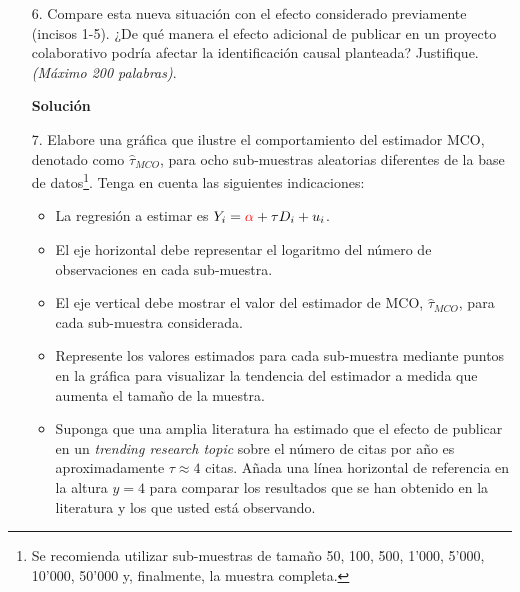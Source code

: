 \documentclass[a4paper, answers, addpoints, 11pt]{exam}
\begin{document}
\bigskip
\begin{itemize}
    \item[6.] Compare esta nueva situación con el efecto considerado previamente (incisos 1-5). ¿De qué manera el efecto adicional de publicar en un proyecto colaborativo podría afectar la identificación causal planteada? Justifique. \textit{(Máximo 200 palabras)}.
     \begin{mdframed}
        \textbf{Solución}
        \end{mdframed}

    \item[7.] Elabore una gráfica que ilustre el comportamiento del estimador MCO, denotado como $\hat{\tau}_{MCO}$, para ocho sub-muestras aleatorias diferentes de la base de datos\footnote{Se recomienda utilizar sub-muestras de tamaño 50, 100, 500, 1'000, 5'000, 10'000, 50'000 y, finalmente, la muestra completa.}. Tenga en cuenta las siguientes indicaciones:  

    \begin{itemize}
        \item La regresión a estimar es $Y_i = \textcolor{red}{\alpha}+\tau D_i + u_i$.
    
        \item El eje horizontal debe representar el logaritmo del número de observaciones en cada sub-muestra.  

        \item El eje vertical debe mostrar el valor del estimador de MCO, $\hat{\tau}_{MCO}$, para cada sub-muestra considerada.  

        \item Represente los valores estimados para cada sub-muestra mediante puntos en la gráfica para visualizar la tendencia del estimador a medida que aumenta el tamaño de la muestra.  

        \item Suponga que una amplia literatura ha estimado que el efecto de publicar en un \textit{trending research topic} sobre el número de citas por año es aproximadamente $\tau \approx 4$ citas. Añada una línea horizontal de referencia en la altura $y=4$ para comparar los resultados que se han obtenido en la literatura y los que usted está observando.
    \end{itemize}  


\end{itemize}
\end{document}
